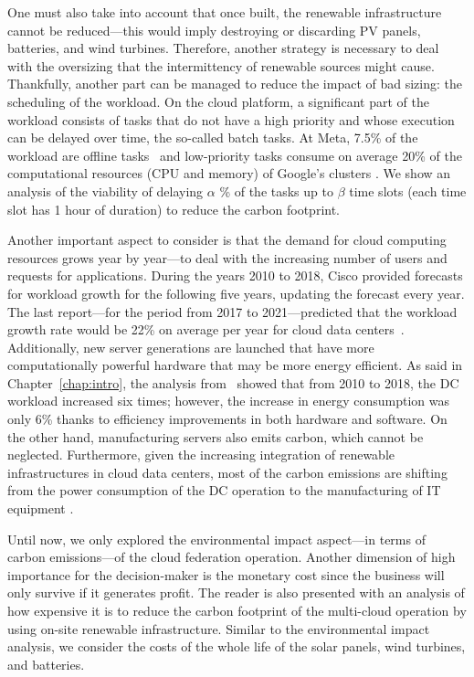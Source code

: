 One must also take into account that once built, the renewable infrastructure cannot be reduced---this would imply destroying or discarding PV panels, batteries, and wind turbines. Therefore, another strategy is necessary to deal with the oversizing that the intermittency of renewable sources might cause. Thankfully, another part can be managed to reduce the impact of bad sizing: the scheduling of the workload. On the cloud platform, a significant part of the workload consists of tasks that do not have a high priority and whose execution can be delayed over time, the so-called batch tasks. At Meta, 7.5\% of the workload are offline tasks~\cite{acun2022holistic} and low-priority tasks consume on average 20\% of the computational resources (CPU and memory) of Google's clusters \cite{googleborg_2020}. We show an analysis of the viability of delaying $\alpha$ \% of the tasks up to $\beta$ time slots (each time slot has 1 hour of duration) to reduce the carbon footprint.

Another important aspect to consider is that the demand for cloud computing resources grows year by year---to deal with the increasing number of users and requests for applications. During the years 2010 to 2018, Cisco provided forecasts for workload growth for the following five years, updating the forecast every year. The last report---for the period from 2017 to 2021---predicted that the workload growth rate would be 22\% on average per year for cloud data centers~\cite{cisco_global_cloud_index_2018}. Additionally, new server generations are launched that have more computationally powerful hardware that may be more energy efficient. As said in Chapter~\ref{chap:intro},  the analysis from~\citet{masanet2020recalibrating} showed that from 2010 to 2018, the DC workload increased six times; however, the increase in energy consumption was only 6\% thanks to efficiency improvements in both hardware and software. On the other hand, manufacturing servers also emits carbon, which cannot be neglected. Furthermore, given the increasing integration of renewable infrastructures in cloud data centers, most of the carbon emissions are shifting from the power consumption of the DC operation to the manufacturing of IT equipment \cite{gupta2021_chasingcarbon}.

Until now, we only explored the environmental impact aspect---in terms of carbon emissions---of the cloud federation operation. Another dimension of high importance for the decision-maker is the monetary cost since the business will only survive if it generates profit. The reader is also presented with an analysis of how expensive it is to reduce the carbon footprint of the multi-cloud operation by using on-site renewable infrastructure. Similar to the environmental impact analysis, we consider the costs of the whole life of the solar panels, wind turbines, and batteries.

